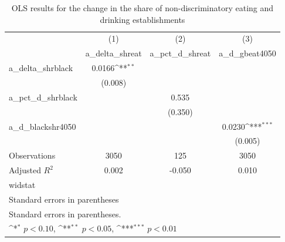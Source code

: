 \begin{table}[htbp]\centering
\def\sym#1{\ifmmode^{#1}\else\(^{#1}\)\fi}
\caption{OLS results for the change in the share of non-discriminatory eating and drinking establishments}
\begin{tabular}{l*{3}{c}}
\hline\hline
                    &\multicolumn{1}{c}{(1)}&\multicolumn{1}{c}{(2)}&\multicolumn{1}{c}{(3)}\\
                    &\multicolumn{1}{c}{a\_delta\_shreat}&\multicolumn{1}{c}{a\_pct\_d\_shreat}&\multicolumn{1}{c}{a\_d\_gbeat4050}\\
\hline
a\_delta\_shrblack    &      0.0166\sym{**} &                     &                     \\
                    &     (0.008)         &                     &                     \\
[1em]
a\_pct\_d\_shrblack    &                     &       0.535         &                     \\
                    &                     &     (0.350)         &                     \\
[1em]
a\_d\_blackshr4050    &                     &                     &      0.0230\sym{***}\\
                    &                     &                     &     (0.005)         \\
\hline
Observations        &        3050         &         125         &        3050         \\
Adjusted \(R^{2}\)  &       0.002         &      -0.050         &       0.010         \\
widstat             &                     &                     &                     \\
\hline\hline
\multicolumn{4}{l}{\footnotesize Standard errors in parentheses}\\
\multicolumn{4}{l}{\footnotesize Standard errors in parentheses.}\\
\multicolumn{4}{l}{\footnotesize \sym{*} \(p<0.10\), \sym{**} \(p<0.05\), \sym{***} \(p<0.01\)}\\
\end{tabular}
\end{table}
